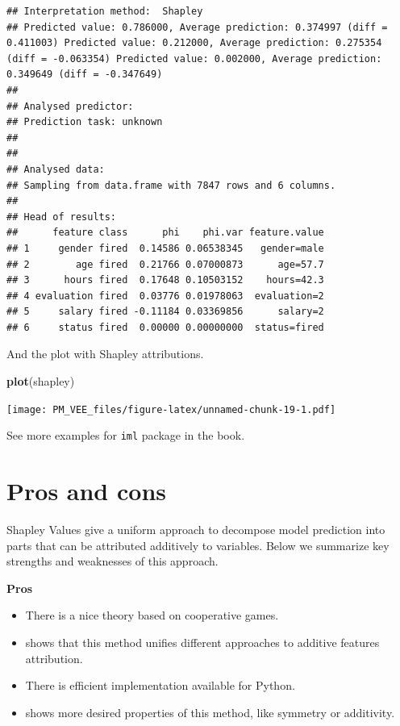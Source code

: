 \documentclass[]{book}
\newenvironment{Shaded}{\begin{snugshade}}{\end{snugshade}}
\newcommand{\KeywordTok}[1]{\textcolor[rgb]{0.13,0.29,0.53}{\textbf{#1}}}
\newcommand{\NormalTok}[1]{#1}
\providecommand{\tightlist}{%
  \setlength{\itemsep}{0pt}\setlength{\parskip}{0pt}}
\theoremstyle{definition}
\theoremstyle{definition}
\theoremstyle{definition}
\theoremstyle{remark}
\begin{document}
\begin{verbatim}
## Interpretation method:  Shapley 
## Predicted value: 0.786000, Average prediction: 0.374997 (diff = 0.411003) Predicted value: 0.212000, Average prediction: 0.275354 (diff = -0.063354) Predicted value: 0.002000, Average prediction: 0.349649 (diff = -0.347649)
## 
## Analysed predictor: 
## Prediction task: unknown 
## 
## 
## Analysed data:
## Sampling from data.frame with 7847 rows and 6 columns.
## 
## Head of results:
##      feature class      phi    phi.var feature.value
## 1     gender fired  0.14586 0.06538345   gender=male
## 2        age fired  0.21766 0.07000873      age=57.7
## 3      hours fired  0.17648 0.10503152    hours=42.3
## 4 evaluation fired  0.03776 0.01978063  evaluation=2
## 5     salary fired -0.11184 0.03369856      salary=2
## 6     status fired  0.00000 0.00000000  status=fired
\end{verbatim}

And the plot with Shapley attributions.

\begin{Shaded}
\begin{Highlighting}[]
\KeywordTok{plot}\NormalTok{(shapley)}
\end{Highlighting}
\end{Shaded}

\texttt{[image: PM\_VEE\_files/figure-latex/unnamed-chunk-19-1.pdf]}

See more examples for \texttt{iml} package in the \citep{molnar} book.

\hypertarget{pros-and-cons-2}{%
\section{Pros and cons}\label{pros-and-cons-2}}

Shapley Values give a uniform approach to decompose model prediction
into parts that can be attributed additively to variables. Below we
summarize key strengths and weaknesses of this approach.

\textbf{Pros}

\begin{itemize}
\tightlist
\item
  There is a nice theory based on cooperative games.
\item
  \citep{SHAP} shows that this method unifies different approaches to
  additive features attribution.
\item
  There is efficient implementation available for Python.
\item
  \citep{SHAP} shows more desired properties of this method, like
  symmetry or additivity.
\end{itemize}
\end{document}
